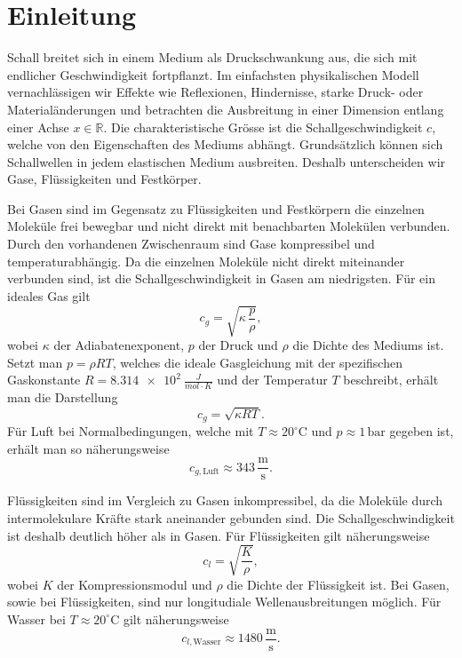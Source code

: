 %
%
%
%
\section{Einleitung\label{schall:section:teil0}}

Schall breitet sich in einem Medium als Druckschwankung aus, die sich
mit endlicher Geschwindigkeit fortpflanzt.
Im einfachsten physikalischen Modell vernachlässigen wir Effekte wie
Reflexionen, Hindernisse, starke Druck- oder Materialänderungen und
betrachten die Ausbreitung in einer Dimension entlang einer Achse
$x \in \mathbb{R}$.
Die charakteristische Grösse ist die Schallgeschwindigkeit $c$, welche
von den Eigenschaften des Mediums abhängt.
Grundsätzlich können sich Schallwellen in jedem elastischen Medium ausbreiten.
Deshalb unterscheiden wir Gase, Flüssigkeiten und Festkörper.

Bei Gasen sind im Gegensatz zu Flüssigkeiten und Festkörpern die
einzelnen Moleküle frei bewegbar und nicht direkt mit
benachbarten Molekülen verbunden.
Durch den vorhandenen Zwischenraum sind Gase kompressibel und
temperaturabhängig.
Da die einzelnen Moleküle nicht direkt miteinander verbunden sind,
ist die Schallgeschwindigkeit in Gasen am niedrigsten.
Für ein ideales Gas gilt
\begin{equation}
    c_{g} = \sqrt{\kappa \, \frac{p}{\rho}},
\end{equation}
wobei $\kappa$ der Adiabatenexponent, $p$ der Druck und $\rho$ die
Dichte des Mediums ist.
Setzt man $p = \rho R T$, welches die ideale Gasgleichung mit der
spezifischen Gaskonstante $R = \SI{8.314e2}{\frac{J}{mol \cdot K}}$
und der Temperatur $T$ beschreibt, erhält man die Darstellung
\begin{equation}
    c_{g} = \sqrt{\kappa R T}.
    \label{eq:c-ideal-gas}
\end{equation}
Für Luft bei Normalbedingungen, welche mit
$T \approx 20^\circ \mathrm{C}$ und $p \approx 1\,\mathrm{bar}$
gegeben ist, erhält man so näherungsweise
\begin{equation}
    c_{g,\text{Luft}} \approx 343 \,\frac{\mathrm{m}}{\mathrm{s}}.
\end{equation}

Flüssigkeiten sind im Vergleich zu Gasen inkompressibel, da die
Moleküle durch intermolekulare Kräfte stark aneinander gebunden sind.
Die Schallgeschwindigkeit ist deshalb deutlich höher als in Gasen.
Für Flüssigkeiten gilt näherungsweise
\begin{equation}
    c_{l} = \sqrt{\frac{K}{\rho}},
    \label{eq:c-liquid}
\end{equation}
wobei $K$ der Kompressionsmodul und $\rho$ die Dichte der Flüssigkeit ist.
Bei Gasen, sowie bei Flüssigkeiten, sind nur longitudiale
Wellenausbreitungen möglich.
Für Wasser bei $T \approx 20^\circ \mathrm{C}$ gilt näherungsweise
\begin{equation}
    c_{l,\text{Wasser}} \approx 1480 \,\frac{\mathrm{m}}{\mathrm{s}}.
\end{equation}


